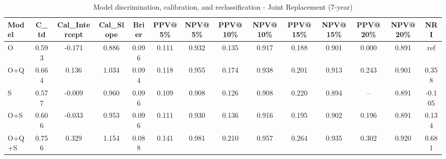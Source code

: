 \begin{table}[htbp]
\centering
\small
\caption{Model discrimination, calibration, and reclassification - Joint Replacement (7-year)}
\label{tab:perf_joint_7y}
\begin{tabular}{lccccccccccccc}
\toprule
Model & C\_td & Cal\_Intercept & Cal\_Slope & Brier & PPV@5\% & NPV@5\% & PPV@10\% & NPV@10\% & PPV@15\% & NPV@15\% & PPV@20\% & NPV@20\% & NRI \\
\midrule
O & 0.593 & -0.171 & 0.886 & 0.096 & 0.111 & 0.932 & 0.135 & 0.917 & 0.188 & 0.901 & 0.000 & 0.891 & ref \\
O+Q & 0.664 & 0.136 & 1.034 & 0.094 & 0.118 & 0.955 & 0.174 & 0.938 & 0.201 & 0.913 & 0.243 & 0.901 & 0.358 \\
S & 0.577 & -0.009 & 0.960 & 0.096 & 0.109 & 0.908 & 0.126 & 0.908 & 0.220 & 0.894 & -- & 0.891 & -0.105 \\
O+S & 0.606 & -0.033 & 0.953 & 0.096 & 0.111 & 0.930 & 0.136 & 0.916 & 0.195 & 0.902 & 0.196 & 0.891 & 0.134 \\
O+Q+S & 0.756 & 0.329 & 1.154 & 0.088 & 0.141 & 0.981 & 0.210 & 0.957 & 0.264 & 0.935 & 0.302 & 0.920 & 0.681 \\
\bottomrule
\end{tabular}
\end{table}